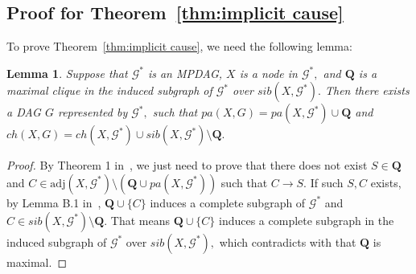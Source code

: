 \documentclass{article}
\newtheorem{lemma}{Lemma}
\begin{document}
\subsection{Proof for Theorem~\ref{thm:implicit cause}}
To prove Theorem~\ref{thm:implicit cause}, we need the following lemma:
\begin{lemma}
\label{lemma: maxclique is pa}
Suppose that $\mathcal{G}^*$ is an MPDAG, $X$ is a node in $\mathcal{G}^*,$ and $\mathbf{Q}$ is a maximal clique in the induced subgraph of $\mathcal{G}^*$ over $sib(X,\mathcal{G}^*).$ Then there exists a DAG $G$ represented by $\mathcal{G}^*,$ such that $pa(X,G)=pa(X,\mathcal{G}^*)\cup \mathbf{Q}$ and $ch(X,G)=ch(X,\mathcal{G}^*)\cup sib(X,\mathcal{G}^*) \setminus \mathbf{Q}.$
\end{lemma}
\begin{proof}
By Theorem 1 in~\citep{fang2020ida}, we just need to prove that there does not exist $S\in \mathbf{Q}$ and $C\in \mathrm{adj}(X,\mathcal{G}^*)\setminus (\mathbf{Q}\cup pa(X,\mathcal{G}^*))$ such that $C\to S.$ If such $S,C$ exists, by Lemma B.1 in~\citep{zuo2022counterfactual}, $\mathbf{Q}\cup \{C\}$ induces a complete subgraph of $\mathcal{G}^*$ and $C\in sib(X,\mathcal{G}^*)\setminus \mathbf{Q}.$ That means $\mathbf{Q}\cup \{C\}$ induces a complete subgraph in the induced subgraph of $\mathcal{G}^*$ over $sib(X,\mathcal{G}^*),$ which contradicts with that $\mathbf{Q}$ is maximal.
\end{proof}
\end{document}
